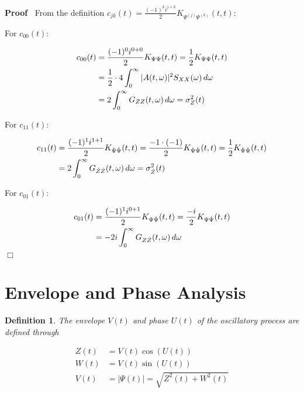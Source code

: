 \documentclass{article}
\newenvironment{proof}{\noindent\textbf{Proof\ }}{\hspace*{\fill}$\Box$\medskip}
\newtheorem{definition}{Definition}
\begin{document}
\begin{proof}
  From the definition $c_{jk} (t) = \frac{(- 1)^k i^{j + k}}{2} K_{\Psi^{(j)}
  \Psi^{(k)}} (t, t)$:
  
  For $c_{00} (t)$:
  
  \begin{align}
    c_{00} (t) & = \frac{(- 1)^0 i^{0 + 0}}{2} K_{\Psi \Psi} (t, t) =
    \frac{1}{2} K_{\Psi \Psi} (t, t) \\
    & = \frac{1}{2} \cdot 4 \int_0^{\infty} |A (t, \omega) |^2 S_{XX}
    (\omega)  \hspace{0.17em} d \omega \\
    & = 2 \int_0^{\infty} G_{ZZ} (t, \omega)  \hspace{0.17em} d \omega =
    \sigma_Z^2 (t) 
  \end{align}
  
  For $c_{11} (t)$:
  
  \begin{align}
    c_{11} (t) & = \frac{(- 1)^1 i^{1 + 1}}{2} K_{\dot{\Psi}  \dot{\Psi}} (t,
    t) = \frac{- 1 \cdot (- 1)}{2} K_{\dot{\Psi}  \dot{\Psi}} (t, t) =
    \frac{1}{2} K_{\dot{\Psi}  \dot{\Psi}} (t, t) \\
    & = 2 \int_0^{\infty} G_{\dot{Z}  \dot{Z}} (t, \omega)  \hspace{0.17em} d
    \omega = \sigma_{\dot{Z}}^2 (t) 
  \end{align}
  
  For $c_{01} (t)$:
  
  \begin{align}
    c_{01} (t) & = \frac{(- 1)^1 i^{0 + 1}}{2} K_{\Psi \dot{\Psi}} (t, t) =
    \frac{- i}{2} K_{\Psi \dot{\Psi}} (t, t) \\
    & = - 2 i \int_0^{\infty} G_{Z \dot{Z}} (t, \omega)  \hspace{0.17em} d
    \omega 
  \end{align}
\end{proof}

\section{Envelope and Phase Analysis}

\begin{definition}
  The envelope $V (t)$ and phase $U (t)$ of the oscillatory process are
  defined through
  
  \begin{align}
    Z (t) & = V (t) \cos (U (t)) \\
    W (t) & = V (t) \sin (U (t)) \\
    V (t) & = | \Psi (t) | = \sqrt{Z^2 (t) + W^2 (t)} 
  \end{align}
\end{definition}
\end{document}
